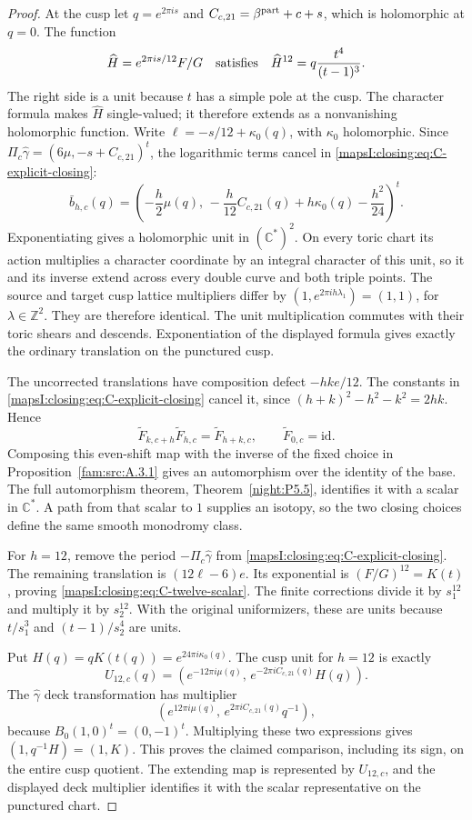 \begin{proof}
At the cusp let \(q=e^{2\pi i s}\) and
\(C_{c,21}=\beta^{\rm part}+c+s\), which is holomorphic at
\(q=0\). The function
\[
 \widehat H=e^{2\pi i s/12}F/G
 \quad\hbox{satisfies}\quad
 \widehat H^{12}=q\frac{t^4}{(t-1)^3}.
\]
The right side is a unit because \(t\) has a simple pole at the
cusp. The character formula makes \(\widehat H\) single-valued;
it therefore extends as a nonvanishing holomorphic function. Write
\(\ell=-s/12+\kappa_0(q)\), with \(\kappa_0\) holomorphic.
Since
\(\Pi_c\widehat\gamma=(6\mu,-s+C_{c,21})^t\),
the logarithmic terms cancel in \eqref{mapsI:closing:eq:C-explicit-closing}:
\[
 \bar b_{h,c}(q)=
 \left(-\frac h2\mu(q),\,
 -\frac h{12}C_{c,21}(q)+h\kappa_0(q)-\frac{h^2}{24}\right)^t.
\]
Exponentiating gives a holomorphic unit in \((\mathbb C^*)^2\).
On every toric chart its action multiplies a character coordinate
by an integral character of this unit, so it and its inverse
extend across every double curve and both triple points. The
source and target cusp lattice multipliers differ by
\((1,e^{2\pi i h\lambda_1})=(1,1)\), for
\(\lambda\in\mathbb Z^2\). They are therefore identical. The
unit multiplication commutes with their toric shears and descends.
Exponentiation of the displayed formula gives exactly the ordinary
translation on the punctured cusp. 

The uncorrected translations have composition defect
\(-hk e/12\). The constants in
\eqref{mapsI:closing:eq:C-explicit-closing} cancel it, since
\((h+k)^2-h^2-k^2=2hk\). Hence
\[
 \widetilde F_{k,c+h}\widetilde F_{h,c}
       =\widetilde F_{h+k,c},\qquad
 \widetilde F_{0,c}=\mathrm{id}.
\]
Composing this even-shift map with the inverse of the fixed choice in Proposition~\ref{fam:src:A.3.1} gives an automorphism over the identity of the base. The full automorphism theorem, Theorem~\ref{night:P5.5}, identifies it with a scalar in $\mathbb C^*$. A path from that scalar to $1$ supplies an isotopy, so the two closing choices define the same smooth monodromy class.

For \(h=12\), remove the period
\(-\Pi_c\widehat\gamma\) from \eqref{mapsI:closing:eq:C-explicit-closing}.
The remaining translation is \((12\ell-6)e\). Its exponential
is \((F/G)^{12}=K(t)\), proving
\eqref{mapsI:closing:eq:C-twelve-scalar}. The finite corrections divide it by
\(s_1^{12}\) and multiply it by \(s_2^{12}\). With the original
uniformizers, these are units because
\(t/s_1^3\) and \((t-1)/s_2^4\) are units. 

Put \(H(q)=qK(t(q))=e^{24\pi i\kappa_0(q)}\). The cusp unit
for \(h=12\) is exactly
\[
 U_{12,c}(q)=
 \left(e^{-12\pi i\mu(q)},\,
       e^{-2\pi i C_{c,21}(q)}H(q)\right).
\]
The \(\widehat\gamma\) deck transformation has multiplier
\[
 \left(e^{12\pi i\mu(q)},\,
       e^{2\pi i C_{c,21}(q)}q^{-1}\right),
\]
because \(B_0(1,0)^t=(0,-1)^t\). Multiplying these two
expressions gives \((1,q^{-1}H)=(1,K)\). This proves the
claimed comparison, including its sign, on the entire cusp
quotient. The extending map is represented by $U_{12,c}$, and the displayed deck multiplier identifies it with the scalar representative on the punctured chart.


\end{proof}
